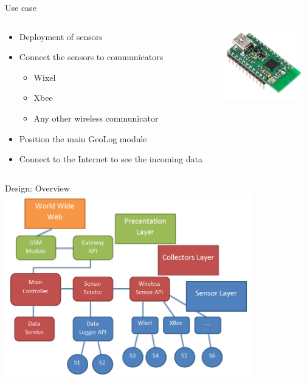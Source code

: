 \documentclass{beamer}
\begin{document}
\begin{frame}{Use case}
\begin{columns}[T] %
     \begin{column}[T]{7cm} %
		\begin{itemize}
		\item Deployment of sensors
		\item Connect the sensors to communicators
			\begin{itemize}
			\item Wixel
			\item Xbee
			\item Any other wireless communicator
			\end{itemize}
		\item Position the main GeoLog module
		\item Connect to the Internet to see the incoming data
		\end{itemize}
	\end{column}
     \begin{column}[T]{3cm} %
          \includegraphics[height=3cm]{graphics/wixel.png}
          \cite{wixel}
     \end{column}
     \end{columns}
\end{frame}

\begin{frame}{Design: Overview}
\includegraphics[height=8cm]{graphics/softwareArchitecture.png}
\end{frame}
\end{document}
